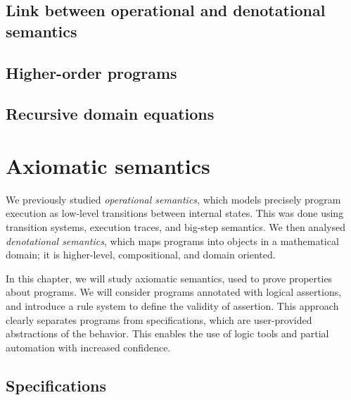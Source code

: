 \documentclass[toc, titlepaged]{../cs-classes/cs-classes}
\begin{document}
\subsection{Link between operational and denotational semantics}

\subsection{Higher-order programs}

\subsection{Recursive domain equations}


\section{Axiomatic semantics}
We previously studied \emph{operational semantics}, which models precisely program execution as low-level transitions between internal states. This was done using transition systems, execution traces, and big-step semantics. We then analysed \emph{denotational semantics}, which maps programs into objects in a mathematical domain; it is higher-level, compositional, and domain oriented. 

In this chapter, we will study axiomatic semantics, used to prove properties about programs. We will consider programs annotated with logical assertions, and introduce a rule system to define the validity of assertion. This approach clearly separates programs from specifications, which are user-provided abstractions of the behavior. This enables the use of logic tools and partial automation with increased confidence.

\subsection{Specifications}
\end{document}
